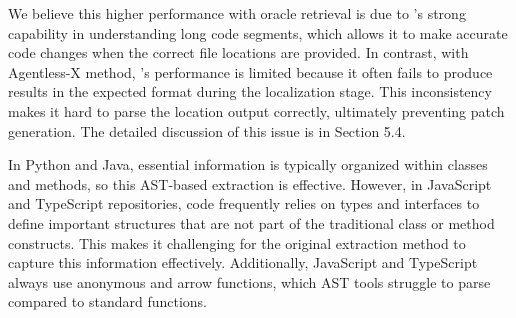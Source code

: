 \documentclass[12pt,american]{article}
\begin{document}
\begin{revresponse}
\begin{enumerate}
\begin{changes}

 We believe this higher performance with oracle retrieval is due to \Claude's strong capability in understanding long code segments, which allows it to make accurate code changes when the correct file locations are provided. In contrast, with Agentless-X method, \Claude's performance is limited because it often fails to produce results in the expected format during the localization stage. This inconsistency makes it hard to parse the location output correctly, ultimately preventing patch generation. The detailed discussion of this issue is in Section 5.4. 

   In Python and Java, essential information is typically organized within classes and methods, so this AST-based extraction is effective. However, in JavaScript and TypeScript repositories, code frequently relies on types and interfaces to define important structures that are not part of the traditional class or method constructs. This makes it challenging for the original extraction method to capture this information effectively. Additionally, JavaScript and TypeScript always use anonymous and arrow functions, which AST tools struggle to parse compared to standard functions.  


\end{changes}
\end{enumerate}
\end{revresponse}
\end{document}
